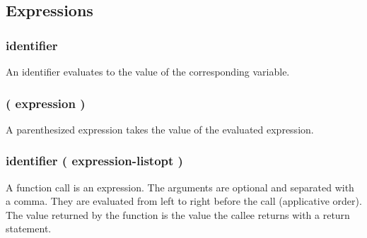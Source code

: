 \documentclass[12pt]{article}
\begin{document}
\subsection{Expressions}
\subsubsection{identifier}
An identifier evaluates to the value of the corresponding variable.

\subsubsection{( expression )}
A parenthesized expression takes the value of the evaluated expression.
\subsubsection{identifier ( expression-listopt )}
A function call is an expression. The arguments are optional and separated with a comma. They are evaluated
from left to right before the call (applicative order). The value returned by the function is the value the callee
returns with a return statement.
\end{document}
